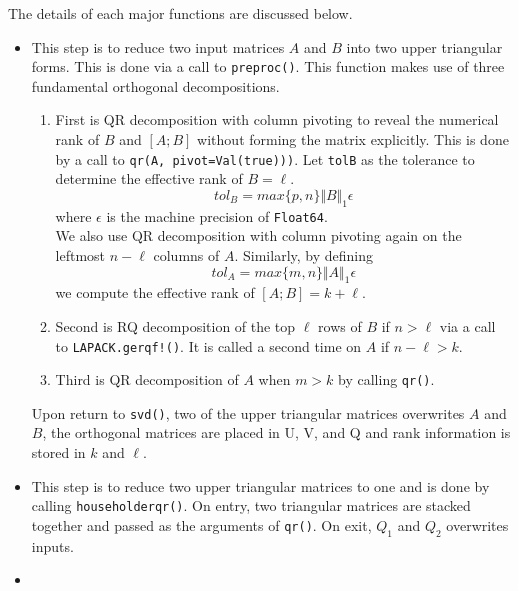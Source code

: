 The details of each major functions are discussed below. 
\begin{itemize} 
\item {}

    This step is to reduce two input matrices $A$ and $B$ into two upper triangular forms. This is done via a call to \texttt{preproc()}. This function makes use of three fundamental orthogonal decompositions. 
    \begin{enumerate}
    	\item First is QR decomposition with column pivoting to reveal the numerical rank of $B$ and $[A; B]$ without forming the matrix explicitly. This is done by a call to \texttt{qr(A, pivot=Val(true)))}. Let \texttt{tolB} as the tolerance to determine the effective rank of $B = \ell$.
		\begin{equation*}
			tol_{B} = max\{p, n\}\Vert B \Vert_1 \epsilon
		\end{equation*}
		where $\epsilon$ is the machine precision of \texttt{Float64}. \\
		We also use QR decomposition with column pivoting again on the leftmost $n-\ell$ columns of $A$. Similarly, by defining
		\begin{equation*}
			tol_{A} = max\{m, n\}\Vert A \Vert_1 \epsilon
		\end{equation*}
		we compute the effective rank of $[A; B] = k+ \ell$.
		\item Second is RQ decomposition of the top $\ell$ rows of $B$ if $n > \ell$ via a call to \texttt{LAPACK.gerqf!()}. It is called a second time on $A$ if $n - \ell > k$.
		\item Third is QR decomposition of $A$ when $m > k$ by calling \texttt{qr()}. 
	\end{enumerate}
	Upon return to \texttt{svd()}, two of the upper triangular matrices overwrites $A$ and $B$, the orthogonal matrices are placed in U, V, and Q and rank information is stored in $k$ and $\ell$.

\item {} 
    
    This step is to reduce two upper triangular matrices to one and is done by calling \texttt{householderqr()}. On entry, two triangular matrices are stacked together and passed as the arguments of \texttt{qr()}. On exit, $Q_1$ and $Q_2$ overwrites inputs.  
    
\item {}
    

\end{itemize}
